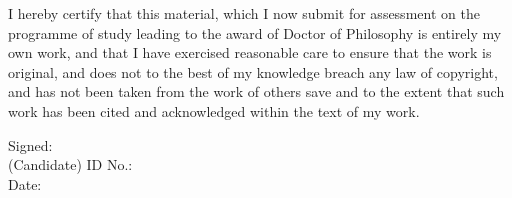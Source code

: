 \thispagestyle{plain}

I hereby certify that this material, which I now submit for assessment on the
programme of study leading to the award of Doctor of Philosophy is entirely my own work, and that I have
exercised reasonable care to ensure that the work is original, and does not to
the best of my knowledge breach any law of copyright, and has not been
taken from the work of others save and to the extent that such work has
been cited and acknowledged within the text of my work.



\vspace{0.5cm}

\doublespacing
\noindent
Signed: \\
(Candidate) ID No.: \\
Date:
